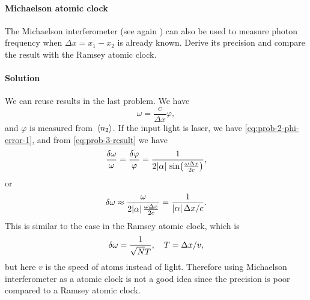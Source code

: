 \documentclass[hyperref, a4paper]{article}
\begin{document}
\paragraph{}

\paragraph{Michaelson atomic clock} The Michaelson interferometer (see again ) can also be used
to measure photon frequency when $\Delta x = x_1 - x_2$ is already known. Derive its precision and compare the result with 
the Ramsey atomic clock.

\paragraph{Solution} We can reuse results in the last problem. We have 
\begin{equation}
    \omega = \frac{c}{\Delta x} \varphi,
    \label{eq:prob-3-result}
\end{equation}
and $\varphi$ is measured from $\expval*{n_2}$. If the input light is laser, we have \eqref{eq:prob-2-phi-error-1},
and from \eqref{eq:prob-3-result} we have 
\begin{equation}
    \frac{\var{\omega}}{\omega} = \frac{\var{\varphi}}{\varphi} = \frac{1}{2 \abs*{\alpha} \sin(\frac{\omega \Delta x}{2 c})},
\end{equation}
or 
\begin{equation}
    \var{\omega} \approx \frac{\omega}{2 \abs*{\alpha} \frac{\omega \Delta x}{2 c}} = \frac{1}{\abs*{\alpha} \Delta x / c}.
\end{equation}
This is similar to the case in the Ramsey atomic clock, which is 
\begin{equation}
    \var{\omega} = \frac{1}{\sqrt{N} T}, \quad T = \Delta x / v,
\end{equation}
but here $v$ is the speed of atoms instead of light. Therefore using Michaelson interferometer as a atomic clock is not a good idea since the precision is poor compared to a Ramsey atomic clock.
\end{document}
